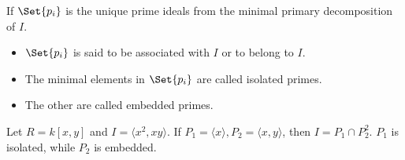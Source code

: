 \begin{definition}
  If $\Set{p_i}$ is the unique prime ideals from the minimal primary decomposition of $I$.
  \begin{itemize}
    \item $\Set{p_i}$ is said to be associated with $I$ or to belong to $I$.
    \item The minimal elements in $\Set{p_i}$ are called isolated primes.
    \item The other are called embedded primes.
  \end{itemize}
\end{definition}

\begin{example}
  Let $R = k[x, y]$ and $I = \langle x^2, xy \rangle$. If $P_1 = \langle x \rangle,
  P_2 = \langle x, y \rangle$, then $I = P_1 \cap P_2^2$.
  $P_1$ is isolated, while $P_2$ is embedded.
\end{example}
